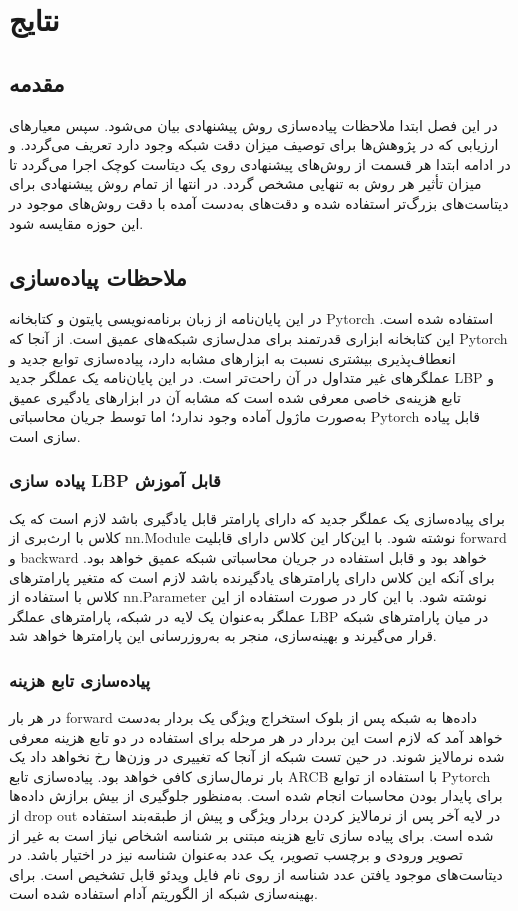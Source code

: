 \chapter{نتایج}
\label{chap:results}
\section{مقدمه} 
در این فصل ابتدا ملاحظات پیاده‌سازی روش پیشنهادی بیان می‌شود. سپس معیارهای ارزیابی که در پژوهش‌ها برای توصیف میزان دقت شبکه وجود دارد تعریف می‌گردد. و در ادامه ابتدا هر قسمت از روش‌های پیشنهادی روی یک دیتاست کوچک اجرا می‌گردد تا میزان تأثیر هر روش به تنهایی مشخص گردد. در انتها از تمام روش پیشنهادی برای دیتاست‌های بزرگ‌تر استفاده شده و دقت‌های به‌دست آمده با دقت روش‌های موجود در این حوزه مقایسه شود.
\section{ملاحظات پیاده‌سازی}
در این پایان‌نامه از زبان برنامه‌نویسی پایتون و کتابخانه Pytorch استفاده شده است. این کتابخانه ابزاری قدرتمند برای مدل‌سازی شبکه‌های عمیق است. از آنجا که Pytorch انعطاف‌پذیری بیشتری نسبت به ابزارهای مشابه دارد، پیاده‌سازی توابع جدید و عملگرهای غیر متداول در آن راحت‌تر است. در این پایان‌نامه یک عملگر جدید LBP و تابع هزینه‌ی خاصی معرفی شده است که مشابه آن در ابزارهای یادگیری عمیق به‌صورت ماژول آماده وجود ندارد؛ اما توسط جریان محاسباتی Pytorch قابل پیاده سازی است. 
\subsection{پیاده سازی LBP قابل آموزش}
برای پیاده‌سازی یک عملگر جدید که دارای پارامتر قابل یادگیری باشد لازم است که یک کلاس با ارث‌بری از nn.Module نوشته شود. با این‌کار این کلاس دارای قابلیت forward و backward خواهد بود و قابل استفاده در جریان محاسباتی شبکه عمیق خواهد بود.
برای آنکه این کلاس دارای پارامترهای یادگیرنده باشد لازم است که متغیر پارامترهای کلاس با استفاده از nn.Parameter نوشته شود. با این کار در صورت استفاده از این عملگر به‌عنوان یک لایه در شبکه، پارامترهای عملگر LBP در میان پارامترهای شبکه قرار می‌گیرند و بهینه‌سازی، منجر به به‌روزرسانی این پارامترها خواهد شد.
\subsection{پیاده‌سازی تابع هزینه}
در هر بار forward داده‌ها به شبکه پس از بلوک استخراج ویژگی یک بردار به‌دست خواهد آمد که لازم است این بردار در هر مرحله برای استفاده در دو تابع هزینه معرفی شده نرمالایز شوند. در حین تست شبکه از آنجا که تغییری در وزن‌ها رخ نخواهد داد یک بار نرمال‌سازی کافی خواهد بود. پیاده‌سازی تابع َARCB با استفاده از توابع Pytorch برای پایدار بودن محاسبات انجام شده است. به‌منظور جلوگیری از بیش برازش داده‌ها از drop out
\cite{srivastava2014dropout}
در لایه آخر پس از نرمالایز کردن بردار ویژگی و پیش از طبقه‌بند استفاده شده است. 
برای پیاده سازی تابع هزینه مبتنی بر شناسه اشخاص نیاز است به غیر از تصویر ورودی و برچسب تصویر، یک عدد به‌عنوان شناسه نیز در اختیار باشد. در دیتاست‌های موجود یافتن عدد شناسه از روی نام فایل ویدئو قابل تشخیص است. برای بهینه‌سازی شبکه از الگوریتم آدام 
\cite{kingma2014adam}
استفاده شده است.
